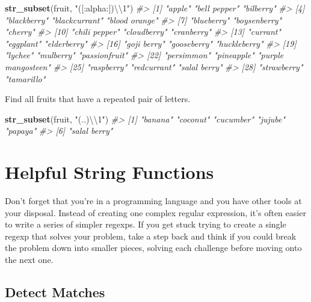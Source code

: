 \documentclass[]{book}
\newenvironment{Shaded}{\begin{snugshade}}{\end{snugshade}}
\newcommand{\KeywordTok}[1]{\textcolor[rgb]{0.13,0.29,0.53}{\textbf{#1}}}
\newcommand{\CharTok}[1]{\textcolor[rgb]{0.31,0.60,0.02}{#1}}
\newcommand{\StringTok}[1]{\textcolor[rgb]{0.31,0.60,0.02}{#1}}
\newcommand{\CommentTok}[1]{\textcolor[rgb]{0.56,0.35,0.01}{\textit{#1}}}
\newcommand{\NormalTok}[1]{#1}
\theoremstyle{definition}
\theoremstyle{definition}
\theoremstyle{definition}
\theoremstyle{remark}
\begin{document}
\begin{Shaded}
\begin{Highlighting}[]
\KeywordTok{str_subset}\NormalTok{(fruit, }\StringTok{"([:alpha:])}\CharTok{\textbackslash{}\textbackslash{}}\StringTok{1"}\NormalTok{)}
\CommentTok{#>  [1] "apple"             "bell pepper"       "bilberry"         }
\CommentTok{#>  [4] "blackberry"        "blackcurrant"      "blood orange"     }
\CommentTok{#>  [7] "blueberry"         "boysenberry"       "cherry"           }
\CommentTok{#> [10] "chili pepper"      "cloudberry"        "cranberry"        }
\CommentTok{#> [13] "currant"           "eggplant"          "elderberry"       }
\CommentTok{#> [16] "goji berry"        "gooseberry"        "huckleberry"      }
\CommentTok{#> [19] "lychee"            "mulberry"          "passionfruit"     }
\CommentTok{#> [22] "persimmon"         "pineapple"         "purple mangosteen"}
\CommentTok{#> [25] "raspberry"         "redcurrant"        "salal berry"      }
\CommentTok{#> [28] "strawberry"        "tamarillo"}
\end{Highlighting}
\end{Shaded}

Find all fruits that have a repeated pair of letters.

\begin{Shaded}
\begin{Highlighting}[]
\KeywordTok{str_subset}\NormalTok{(fruit, }\StringTok{"(..)}\CharTok{\textbackslash{}\textbackslash{}}\StringTok{1"}\NormalTok{)}
\CommentTok{#> [1] "banana"      "coconut"     "cucumber"    "jujube"      "papaya"     }
\CommentTok{#> [6] "salal berry"}
\end{Highlighting}
\end{Shaded}

\section{Helpful String Functions}\label{helpful-string-functions}

Don't forget that you're in a programming language and you have other
tools at your disposal. Instead of creating one complex regular
expression, it's often easier to write a series of simpler regexps. If
you get stuck trying to create a single regexp that solves your problem,
take a step back and think if you could break the problem down into
smaller pieces, solving each challenge before moving onto the next one.

\subsection{Detect Matches}\label{detect-matches}
\end{document}
